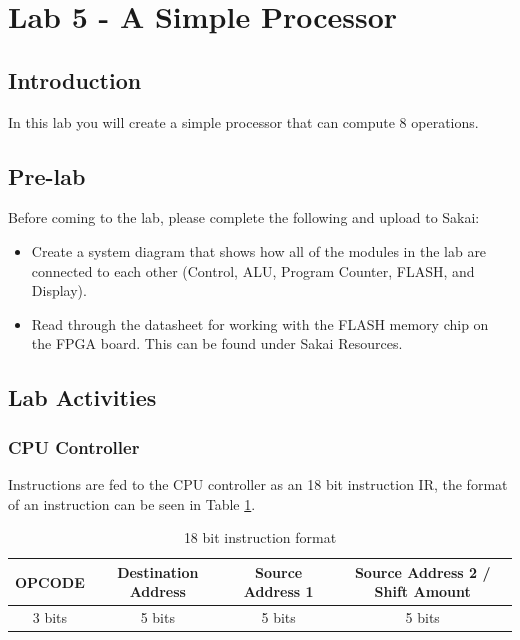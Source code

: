 \section{Lab 5 - A Simple Processor}

\subsection{Introduction}
In this lab you will create a simple processor that can compute 8 operations. 
	
\subsection{Pre-lab}

Before coming to the lab, please complete the following and upload to Sakai:
\begin{itemize}
	\item Create a system diagram that shows how all of the modules in the lab are connected to each other (Control, ALU, Program Counter,  FLASH, and Display). 
	\item Read through the datasheet for working with the FLASH memory chip on the FPGA board. This can be found under Sakai Resources.
\end{itemize}

\subsection{Lab Activities}

\subsubsection{CPU Controller}
Instructions are fed to the CPU controller as an 18 bit instruction IR, the format of an instruction can be seen in Table \ref{tab:instruct}. 

\begin{table}[H]
	\caption{18 bit instruction format}
	\label{tab:instruct}
	\begin{center}
		\begin{tabular}{| c | c | c | c |}
			\hline
			{\bf OPCODE} & {\bf Destination Address} & {\bf Source Address 1} & {\bf Source Address 2 / Shift Amount} \\ \hline
			3 bits & 5 bits & 5 bits & 5 bits \\ 
			\hline
		\end{tabular}
	\end{center}
\end{table}

